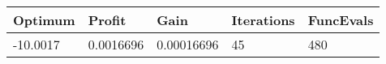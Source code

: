 \begin{tabular}{lllll}
Optimum & Profit & Gain & Iterations & FuncEvals \\ 
\hline 
-10.0017 & 0.0016696 & 0.00016696 & 45 & 480 \\ 
\hline 
\end{tabular}
